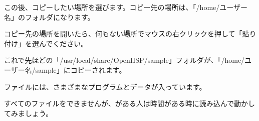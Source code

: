この後、コピーしたい場所を選びます。コピー先の場所は、「/home/ユーザー名」のフォルダになります。

コピー先の場所を開いたら、何もない場所でマウスの右クリックを押して「貼り付け」を選んでください。

これで先ほどの「/usr/local/share/OpenHSP/sample」フォルダが、「/home/ユーザー名/sample」にコピーされます。

ファイルには、さまざまなプログラムとデータが入っています。

すべてのファイルをできませんが、がある人は時間がある時に読み込んで動かしてみましょう。



